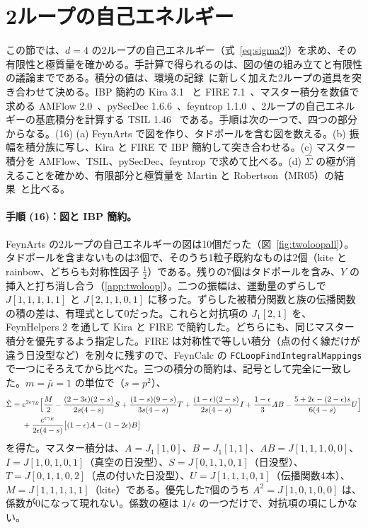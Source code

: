 \documentclass[a4paper,10pt]{ltjsarticle}
\begin{document}
\section{2ループの自己エネルギー}\label{sec:twoloop}

この節では、$d=4$ の2ループの自己エネルギー（式~\eqref{eq:sigma2}）を求め、その有限性と極質量を確かめる。手計算で得られるのは、図の値の組み立てと有限性の議論までである。積分の値は、環境の記録~\cite{env}に新しく加えた2ループの道具を突き合わせて決める。IBP 簡約の Kira 3.1~\cite{kira3} と FIRE 7.1~\cite{fire7}、マスター積分を数値で求める AMFlow 2.0~\cite{amflow,amflow2}、pySecDec 1.6.6~\cite{pysecdec,pysecdec16}、feyntrop 1.1.0~\cite{feyntrop}、2ループの自己エネルギーの基底積分を計算する TSIL 1.46~\cite{tsil} である。手順は次の一つで、四つの部分からなる。(16) (a) FeynArts で図を作り、タドポールを含む図を数える。(b) 振幅を積分族に写し、Kira と FIRE で IBP 簡約して突き合わせる。(c) マスター積分を AMFlow、TSIL、pySecDec、feyntrop で求めて比べる。(d) $\hat\Sigma$ の極が消えることを確かめ、有限部分と極質量を Martin と Robertson（MR05）の結果~\cite{tsil}と比べる。

\paragraph{手順 (16)：図と IBP 簡約。}FeynArts の2ループの自己エネルギーの図は10個だった（図~\ref{fig:twoloopall}）。タドポールを含まないものは3個で、そのうち1粒子既約なものは2個（kite と rainbow、どちらも対称性因子 $\frac12$）である。残りの7個はタドポールを含み、$Y$ の挿入と打ち消し合う（\ref{app:twoloop}）。二つの振幅は、運動量のずらしで $J[1,1,1,1,1]$ と $J[2,1,1,0,1]$ に移った。ずらした被積分関数と族の伝播関数の積の差は、有理式として0だった。これらと対抗項の $J_1[2,1]$ を、FeynHelpers 2 を通して Kira と FIRE で簡約した。どちらにも、同じマスター積分を優先するよう指定した。FIRE は対称性で等しい積分（点の付く線だけが違う日没型など）を別々に残すので、FeynCalc の \texttt{FCLoopFindIntegralMappings} で一つにそろえてから比べた。三つの積分の簡約は、記号として完全に一致した。$m=\bar\mu=1$ の単位で（$s=p^2$）、
\begin{equation}
\begin{aligned}
\hat\Sigma={}&e^{2\epsilon\gamma_E}\Bigl[\frac M2-\frac{(2-3\epsilon)(2-s)}{2s(4-s)}S+\frac{(1-s)(9-s)}{3s(4-s)}T+\frac{(1-\epsilon)(2-s)}{2s(4-s)}I+\frac{1-\epsilon}3AB
-\frac{5+2\epsilon-(2-\epsilon)s}{6(4-s)}U\Bigr]\\
&+\frac{e^{\epsilon\gamma_E}}{2\epsilon(4-s)}\bigl[(1-\epsilon)A-(1-2\epsilon)B\bigr]
\end{aligned}
\label{eq:shat}
\end{equation}
を得た。マスター積分は、$A=J_1[1,0]$、$B=J_1[1,1]$、$AB=J[1,1,1,0,0]$、$I=J[1,0,1,0,1]$（真空の日没型）、$S=J[0,1,1,0,1]$（日没型）、$T=J[0,1,1,0,2]$（点の付いた日没型）、$U=J[1,1,1,0,1]$（伝播関数4本）、$M=J[1,1,1,1,1]$（kite）である。優先した7個のうち $A^2=J[1,0,1,0,0]$ は、係数が0になって現れない。係数の極は $1/\epsilon$ の一つだけで、対抗項の項にしかない。
\end{document}
